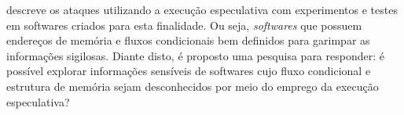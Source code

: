 \documentclass[
	article,			    %
	12pt,				    %
	oneside,			    %
	a4paper,			    %
	chapter=TITLE,		    %
	section=TITLE,		    %
	subsection=TITLE,	    %
	english,			    %
	brazil,				    %
	sumario=tradicional
]{abntex2}
\begin{document}
\begin{comment}
A execução especulativa é uma técnica de projeto de microarquitetura, que proporciona o aprimoramento da velocidade de processamento nos processadores modernos. Está presente em muitos processadores de vários fabricantes, incluindo \emph{Intel}, \emph{AMD} e \emph{ARM Holdings}. Esta técnica consiste na estimativa e execução de instruções, com valores ainda não conhecidos pela CPU, durante um período curto de inatividade (que acontece durante a espera de valores reais, provenientes da memória principal, que é mais lenta do que a memória cache).

Do ponto de vista de funcional, esta especulação traria problemas se os resultados de especulações incorretas fossem efetivados. Porém, quando a verdadeira informação é recuperada, a CPU verifica a exatidão da suposição e descarta o “caminho” (fluxo de execução) que foi executado incorretamente. Eliminando valores nos registradores, ou alterações em variáveis por exemplo.

Apoderando-se do conhecimento micro arquitetural necessário para se conhecer em quais situações e em quais instruções a execução especulativa ocorre, é possível um atacante forçar ou induzir a execução especulativa, por "viciar" o processador em uma cadeia de especulações e transferir as informações especuladas para um canal alternativo (como por exemplo, a memória cache). Caso a transferência seja bem-sucedida, o atacante efetua a leitura dos dados presentes no canal alternativo, neste caso na memória cache, medindo o tempo de acesso aos dados que foram especulados e comparando-os com um tempo médio de acesso (à memória cache) conhecido. Caso a informação demore de ser recuperada (baseando-se na média), supõe-se que ela não se encontra na memória cache. Caso contrário, o atacante acertou a suposição da informação correta.
\end{comment}
 descreve os ataques utilizando a execução especulativa com experimentos e testes em softwares criados para esta finalidade. Ou seja, \emph{softwares} que possuem endereços de memória e fluxos condicionais bem definidos para garimpar as informações sigilosas. Diante disto, é proposto uma pesquisa para responder: é possível explorar informações sensíveis de softwares cujo fluxo condicional e estrutura de memória sejam desconhecidos por meio do emprego da execução especulativa?
\end{document}
